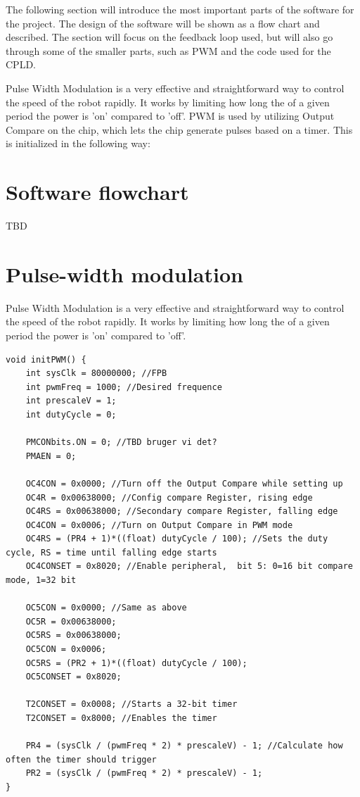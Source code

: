 
The following section will introduce the most important parts of the software for the project. The design of the software will be shown as a flow chart and described.
The section will focus on the feedback loop used, but will also go through some of the smaller parts, such as PWM and the code used for the CPLD.

Pulse Width Modulation is a very effective and straightforward way to control the speed of the robot rapidly. It works by limiting how long the of a given period the power is 'on' compared to 'off'.
PWM is used by utilizing Output Compare on the chip, which lets the chip generate pulses based on a timer. This is initialized in the following way:

\section{Software flowchart}
TBD
\newpage
\section{Pulse-width modulation}
Pulse Width Modulation is a very effective and straightforward way to control the speed of the robot rapidly. It works by limiting how long the of a given period the power is 'on' compared to 'off'.
\begin{lstlisting}
void initPWM() {
    int sysClk = 80000000; //FPB
    int pwmFreq = 1000; //Desired frequence
    int prescaleV = 1; 
    int dutyCycle = 0;
    
    PMCONbits.ON = 0; //TBD bruger vi det?
    PMAEN = 0;
    
    OC4CON = 0x0000; //Turn off the Output Compare while setting up
    OC4R = 0x00638000; //Config compare Register, rising edge
    OC4RS = 0x00638000; //Secondary compare Register, falling edge
    OC4CON = 0x0006; //Turn on Output Compare in PWM mode
    OC4RS = (PR4 + 1)*((float) dutyCycle / 100); //Sets the duty cycle, RS = time until falling edge starts
    OC4CONSET = 0x8020; //Enable peripheral,  bit 5: 0=16 bit compare mode, 1=32 bit
    
    OC5CON = 0x0000; //Same as above
    OC5R = 0x00638000;
    OC5RS = 0x00638000;
    OC5CON = 0x0006;
    OC5RS = (PR2 + 1)*((float) dutyCycle / 100);
    OC5CONSET = 0x8020;
    
    T2CONSET = 0x0008; //Starts a 32-bit timer
    T2CONSET = 0x8000; //Enables the timer

    PR4 = (sysClk / (pwmFreq * 2) * prescaleV) - 1; //Calculate how often the timer should trigger
    PR2 = (sysClk / (pwmFreq * 2) * prescaleV) - 1;
}
\end{lstlisting}

